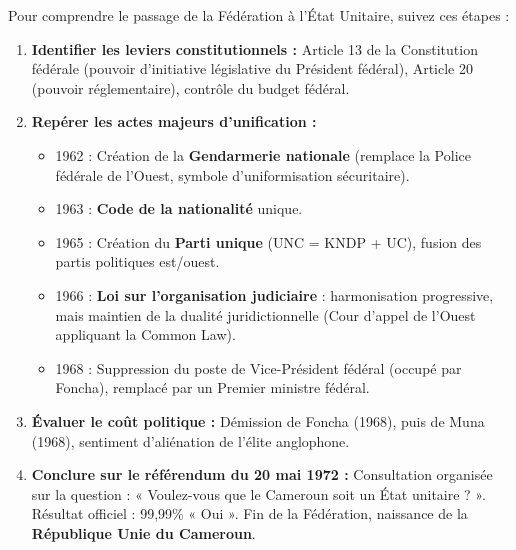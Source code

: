 \documentclass[11pt]{article}
\begin{document}
\begin{methode}
Pour comprendre le passage de la Fédération à l'État Unitaire, suivez ces étapes :
\begin{enumerate}
    \item \textbf{Identifier les leviers constitutionnels :} Article 13 de la Constitution fédérale (pouvoir d'initiative législative du Président fédéral), Article 20 (pouvoir réglementaire), contrôle du budget fédéral.
    \item \textbf{Repérer les actes majeurs d'unification :}
    \begin{itemize}
        \item 1962 : Création de la \textbf{Gendarmerie nationale} (remplace la Police fédérale de l'Ouest, symbole d'uniformisation sécuritaire).
        \item 1963 : \textbf{Code de la nationalité} unique.
        \item 1965 : Création du \textbf{Parti unique} (UNC = KNDP + UC), fusion des partis politiques est/ouest.
        \item 1966 : \textbf{Loi sur l'organisation judiciaire} : harmonisation progressive, mais maintien de la dualité juridictionnelle (Cour d'appel de l'Ouest appliquant la Common Law).
        \item 1968 : Suppression du poste de Vice-Président fédéral (occupé par Foncha), remplacé par un Premier ministre fédéral.
    \end{itemize}
    \item \textbf{Évaluer le coût politique :} Démission de Foncha (1968), puis de Muna (1968), sentiment d'aliénation de l'élite anglophone.
    \item \textbf{Conclure sur le référendum du 20 mai 1972 :} Consultation organisée sur la question : « Voulez-vous que le Cameroun soit un État unitaire ? ». Résultat officiel : 99,99\% « Oui ». Fin de la Fédération, naissance de la \textbf{République Unie du Cameroun}.
\end{enumerate}
\end{methode}
\end{document}
